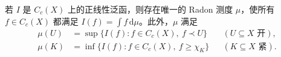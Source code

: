 \documentclass[../../main.tex]{subfiles}
\begin{document}
\begin{theorem}\label{theorem:ch07-riesz-positive}
若 $I$ 是 $C_c(X)$ 上的正线性泛函，则存在唯一的 Radon 测度 $\mu$，使所有 $f\in C_c(X)$ 都满足 $I(f)=\int f\,\mathrm d\mu$。此外，$\mu$ 满足
\begin{align}
\mu(U)&=\sup\{I(f):f\in C_c(X),\ f\prec U\}
&& (U\subseteq X\text{ 开}),\label{align:ch07-riesz-open-sup}\\
\mu(K)&=\inf\{I(f):f\in C_c(X),\ f\geqslant\chi_K\}
&& (K\subseteq X\text{ 紧}).\label{align:ch07-riesz-compact-inf}
\end{align}
\end{theorem}

\end{document}
